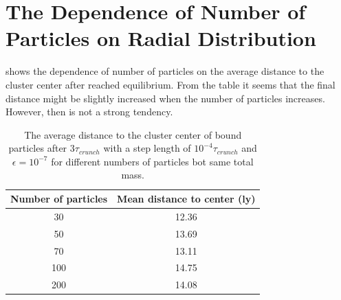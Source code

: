 \section{The Dependence of Number of Particles on Radial Distribution}
\label{sec:NumberPartRadDist}
 shows the dependence of number of particles on the average distance to the cluster center after reached equilibrium. 
From the table it seems that the final distance might be slightly increased when the number of particles increases. 
However, then is not a strong tendency. 
\begin{table}[H]
\centering
\begin{tabular}{|c|c|}
\hline
Number of particles  & Mean distance to center (ly)  \\
\hline
30 & 12.36
\\ \hline
50 & 13.69
\\ \hline
70 & 13.11
\\ \hline
100 & 14.75
\\ \hline
200 & 14.08
\\ \hline
\end{tabular}
\caption{
The average distance to the cluster center of bound particles after $3\tau_{crunch}$ with a step length of $10^{-4}\tau_{crunch}$ and $\epsilon = 10^{-7}$ for different numbers of particles bot same total mass.
}
\label{tab:NumberPartRadDist}
\end{table}
